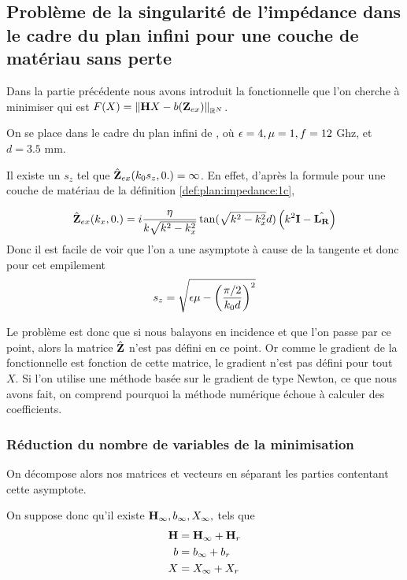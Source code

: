 \subsection{Problème de la singularité de l'impédance dans le cadre du plan infini pour une couche de matériau sans perte}

Dans la partie précédente nous avons introduit la fonctionnelle que l'on cherche à minimiser qui est \(F(X) = \left\lVert{\mathbf{H}} X - b(\mathbf{Z}_{ex})\right\rVert_{\mathbb R^N}\).

On se place dans le cadre du plan infini de \cite{aubakirov_electromagnetic_2014}, où \(\epsilon=4,\mu=1,f=12\) Ghz, et \(d=3.5\) mm. %

Il existe un \(s_z\) tel que \(\hat{\mathbf{Z}}_{ex}(k_0s_z,0.) = \infty\). En effet, d'après la formule pour une couche de matériau de la définition \ref{def:plan:impedance:1c}, 

\begin{equation}
  \hat{\mathbf{Z}}_{ex}(k_x,0.) = i\dfrac{\eta}{k\sqrt{k^2 - k_x^2}}\tan(\sqrt{k^2 - k_x^2}d)\left(k^2\mathbf{I} - \hat{\mathbf{L_R}}\right)
\end{equation}
Donc il est facile de voir que l'on a une asymptote à cause de la tangente et donc pour cet empilement
\begin{equation}
  s_z = \sqrt{\epsilon \mu - \left(\dfrac{\pi/2}{k_0 d}\right)^2}
\end{equation}

Le problème est donc que si nous balayons en incidence et que l'on passe par ce point, alors la matrice \(\hat{\mathbf{Z}}\) n'est pas défini en ce point. Or comme le gradient de la fonctionnelle est fonction de cette matrice, le gradient n'est pas défini pour tout \(X\). Si l'on utilise une méthode basée sur le gradient de type Newton, ce que nous avons fait, on comprend pourquoi la méthode numérique échoue à calculer des coefficients.

\subsubsection{Réduction du nombre de variables de la minimisation}

On décompose alors nos matrices et vecteurs en séparant les parties contentant cette asymptote.

On suppose donc qu'il existe \({\mathbf{H}}_\infty, {b}_\infty, X_\infty,\) tels que
\begin{align*}
  {\mathbf{H}} &= {\mathbf{H}}_\infty + {\mathbf{H}}_r
  \\
  {b} &= {b}_\infty + {b}_r
  \\
  X &= X_\infty + X_r
\end{align*}

